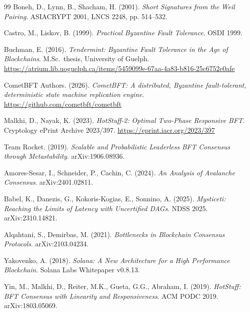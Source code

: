 \begin{thebibliography}{99}
Boneh, D., Lynn, B., Shacham, H. (2001).
\textit{Short Signatures from the Weil Pairing}.
ASIACRYPT 2001, LNCS 2248, pp. 514--532.

Castro, M., Liskov, B. (1999).
\textit{Practical Byzantine Fault Tolerance}.
OSDI 1999.


Buchman, E. (2016).
\textit{Tendermint: Byzantine Fault Tolerance in the Age of Blockchains}.
M.Sc.\ thesis, University of Guelph.
\url{https://atrium.lib.uoguelph.ca/items/5459099e-67aa-4a83-b816-25c6752e0afe}

CometBFT Authors. (2026).
\textit{CometBFT: A distributed, Byzantine fault-tolerant, deterministic state machine replication engine}.
\url{https://github.com/cometbft/cometbft}

Malkhi, D., Nayak, K. (2023).
\textit{HotStuff-2: Optimal Two-Phase Responsive BFT}.
Cryptology ePrint Archive 2023/397.
\url{https://eprint.iacr.org/2023/397}

Team Rocket. (2019).
\textit{Scalable and Probabilistic Leaderless BFT Consensus through Metastability}.
arXiv:1906.08936.

Amores-Sesar, I., Schneider, P., Cachin, C. (2024).
\textit{An Analysis of Avalanche Consensus}.
arXiv:2401.02811.

Babel, K., Danezis, G., Kokoris-Kogias, E., Sonnino, A. (2025).
\textit{Mysticeti: Reaching the Limits of Latency with Uncertified DAGs}.
NDSS 2025. arXiv:2310.14821.

Alqahtani, S., Demirbas, M. (2021).
\textit{Bottlenecks in Blockchain Consensus Protocols}.
arXiv:2103.04234.

Yakovenko, A. (2018).
\textit{Solana: A New Architecture for a High Performance Blockchain}.
Solana Labs Whitepaper v0.8.13.

Yin, M., Malkhi, D., Reiter, M.K., Gueta, G.G., Abraham, I. (2019).
\textit{HotStuff: BFT Consensus with Linearity and Responsiveness}.
ACM PODC 2019. arXiv:1803.05069.

\end{thebibliography}


\appendix

